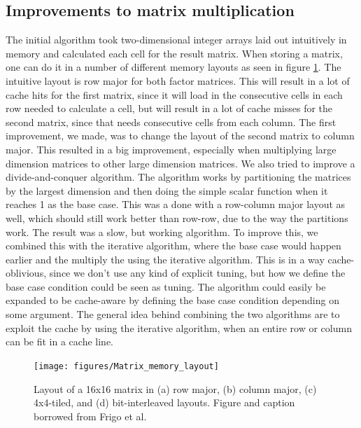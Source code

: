 \documentclass{article}
\begin{document}
\subsection{Improvements to matrix multiplication}
The initial algorithm took two-dimensional integer arrays laid out intuitively in memory and calculated each cell for the result matrix. When storing a matrix, one can do it in a number of different memory layouts as seen in figure \ref{fig:matrix_memory}. The intuitive layout is row major for both factor matrices. This will result in a lot of cache hits for the first matrix, since it will load in the consecutive cells in each row needed to calculate a cell, but will result in a lot of cache misses for the second matrix, since that needs consecutive cells from each column. The first improvement, we made, was to change the layout of the second matrix to column major. This resulted in a big improvement, especially when multiplying large dimension matrices to other large dimension matrices. We also tried to improve a divide-and-conquer algorithm. The algorithm works by partitioning the matrices by the largest dimension and then doing the simple scalar function when it reaches 1 as the base case. This was a done with a row-column major layout as well, which should still work better than row-row, due to the way the partitions work. The result was a slow, but working algorithm. To improve this, we combined this with the iterative algorithm, where the base case would happen earlier and the multiply the using the iterative algorithm. This is in a way cache-oblivious, since we don't use any kind of explicit tuning, but how we define the base case condition could be seen as tuning. The algorithm could easily be expanded to be cache-aware by defining the base case condition depending on some argument. The general idea behind combining the two algorithms are to exploit the cache by using the iterative algorithm, when an entire row or column can be fit in a cache line.
\begin{figure}[H]
  \centering
  \texttt{[image: figures/Matrix\_memory\_layout]}
  \caption{Layout of a 16x16 matrix in (a) row major, (b) column major, (c) 4x4-tiled, and (d) bit-interleaved layouts. Figure and caption borrowed from Frigo et al.\cite[p. 3]{frigo-cache}}
  \label{fig:matrix_memory}
\end{figure}
\end{document}
